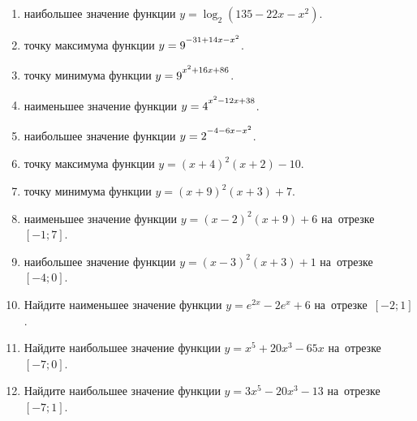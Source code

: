 \documentclass[a4paper,10pt]{article}
\begin{document}
\begin{enumerate}
\item {} наибольшее значение функции $y=\log_2\left(135-22x-x^2\right)$.

\item {} точку максимума функции $y=9\strut^{-31+14x-x^2}$.

\item {} точку минимума функции $y=9\strut^{x^2+16x+86}$.

\item {} наименьшее значение функции $y=4\strut^{x^2-12x+38}$.

\item {} наибольшее значение функции $y=2\strut^{-4-6x-x^2}$.

\item {} точку максимума функции $y=\left(x+4\right)^2\left(x+2\right)-10$.

\item {} точку минимума функции $y=\left(x+9\right)^2\left(x+3\right)+7$.

\item {} наименьшее значение функции $y=\left(x-2\right)^2\left(x+9\right)+6$ на~отрезке~$\left[-1;7\right]$.

\item {} наибольшее значение функции $y=\left(x-3\right)^2\left(x+3\right)+1$ на~отрезке~$\left[-4;0\right]$.

\item Найдите наименьшее значение функции $y=e^{2x}-2e^x+6$ на~отрезке~$\left[-2;1\right]$.

\item Найдите наибольшее значение функции $y=x^5+20x^3-65x$ на~отрезке~$\left[-7;0\right]$.

\item Найдите наибольшее значение функции $y=3x^5-20x^3-13$ на~отрезке~$\left[-7;1\right]$.

\end{enumerate}
\end{document}
